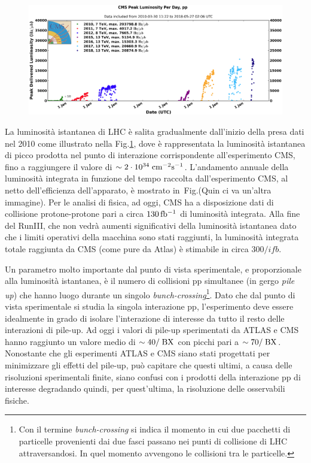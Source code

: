 \begin{figure}
\centering
\includegraphics[width=\textwidth]{Immagini/peak_lumi_ppbis}
\caption{ }
\label{peak_lumi_pp}
\end{figure}
La luminosit\`a istantanea di LHC \`e salita gradualmente dall'inizio della presa dati nel 2010 come illustrato nella Fig.\ref{peak_lumi_pp},
 dove \`e rappresentata la luminosit\`a istantanea di picco prodotta nel punto di interazione corrispondente all'esperimento CMS, fino a raggiungere il valore di $\sim 2\cdot10^{34}\rm \; cm^{-2}{\mathrm s}^{-1}$. L'andamento annuale della luminosit\`a integrata in funzione del tempo raccolta dall'esperimento CMS, al netto dell'efficienza dell'apparato, \`e mostrato in~Fig.(Quin ci va un'altra immagine). Per le analisi di fisica, ad oggi, CMS ha a disposizione dati di collisione protone-protone pari a circa $130{\rm \, fb^{-1}}$ di luminosit\`a integrata. Alla fine del RunIII, che non vedr\`a aumenti significativi della luminosit\`a istantanea dato che i limiti operativi della macchina sono stati raggiunti, la luminosit\`a integrata totale raggiunta da CMS (come pure da Atlas) \`e stimabile in circa $300/ifb$.

Un parametro molto importante dal punto di vista sperimentale, e proporzionale alla luminosit\`a istantanea, \`e il numero di collisioni pp simultanee (in gergo {\em pile up}) che hanno luogo durante un singolo \textit{bunch-crossing}\footnote{Con il termine \textit{bunch-crossing} si indica il momento in cui due pacchetti di particelle provenienti dai due fasci passano nei punti di collisione di LHC attraversandosi. In quel momento avvengono le collisioni tra le particelle.}. Dato che dal punto di vista sperimentale si studia la singola interazione pp, l'esperimento deve essere idealmente in grado di isolare l'interazione di interesse da tutto il resto delle interazioni di pile-up. Ad oggi i valori di pile-up sperimentati da ATLAS e CMS hanno raggiunto un valore medio di $\sim 40/\rm \; BX$ con picchi pari a $\sim 70/\rm \; BX$. Nonostante che gli esperimenti ATLAS e CMS siano stati progettati per minimizzare gli effetti del pile-up, può capitare che questi ultimi, a causa delle risoluzioni sperimentali finite, siano confusi con i prodotti della interazione pp di interesse degradando quindi, per quest'ultima, la risoluzione delle osservabili fisiche.



